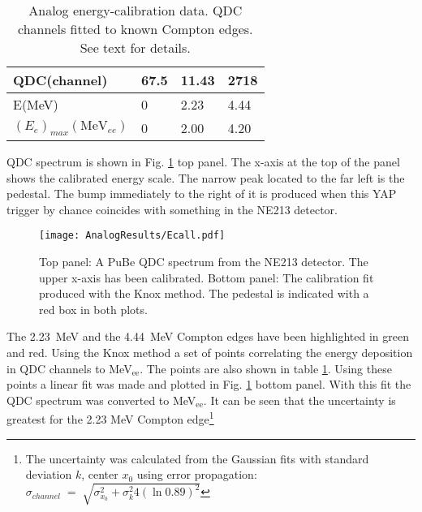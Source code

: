 \documentclass[main.tex]{subfiles}
\begin{document}
\begin{table}[hb]
	\center
	\begin{tabular}{|l|l|l|l|}
	\hline
	QDC(channel)             & 67.5 & 11.43 & 2718 \\
	\hline
	E(MeV)          & 0    & 2.23  & 4.44 \\
	\hline
	$(E_{e})_{max}(\textrm{MeV}_{ee})$ & 0    & 2.00  & 4.20 \\
	\hline
	\end{tabular}
   	\captionsetup{width=0.435\linewidth}
	\caption[Analog energy-calibration data.]{Analog energy-calibration data. QDC channels fitted to known Compton edges. See text for details.}
	\label{tab:knox_a}
\end{table}

QDC spectrum is shown in Fig. \ref{fig:qdc_a} top panel. The x-axis at the top of the panel shows the calibrated energy scale. The narrow peak located to the far left is the pedestal. The bump immediately to the right of it is produced when this YAP trigger by chance coincides with something in the NE213 detector.
\begin{figure}[ht!]
    \centering
        \texttt{[image: AnalogResults/Ecall.pdf]}
        \caption[Energy calibration of the analog setup]{Top panel: A PuBe QDC spectrum from the NE213 detector. The upper x-axis has been calibrated. Bottom panel: The calibration fit produced with the Knox method. The pedestal is indicated with a red box in both plots.}
    \label{fig:qdc_a}
\end{figure}

The \SI{2.23}{MeV} and the \SI{4.44}{MeV} Compton edges have been highlighted in green and red. Using the Knox method a set of points correlating the energy deposition in QDC channels to \si{\MeV}$_\text{ee}$. The points are also shown in table \ref{tab:knox_a}. Using these points a linear fit was made and plotted in Fig. \ref{fig:qdc_a} bottom panel. With this fit the QDC spectrum was converted to \si{\MeV}$_\text{ee}$. It can be seen that the uncertainty is greatest for the 2.23 \si{\MeV} Compton edge\footnote{The uncertainty was calculated from the Gaussian fits with standard deviation $k$, center ${x}_0$ using error propagation: $\sigma_{channel}\;=\;\sqrt{\sigma_{x_0}^2 + \sigma_{k}^2 4\left(\ln0.89\right)^2 }$}
\end{document}
